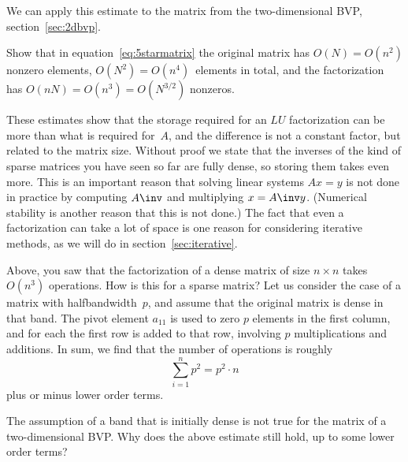 We can apply this estimate to the matrix from the two-dimensional
\ac{BVP}, section~\ref{sec:2dbvp}.  
\begin{exercise}\label{ex:bandfill}
  Show that in equation~\eqref{eq:5starmatrix} the original matrix has
  $O(N)=O(n^2)$ nonzero elements, $O(N^2)=O(n^4)$~elements in total,
  and the factorization has $O(nN)=O(n^3)=O(N^{3/2})$ nonzeros.
\end{exercise}

These estimates show that the storage required for an $LU$
factorization can be more than what is required for~$A$, and the
difference is not a constant factor, but related to the matrix
size. Without proof we state that the inverses of the kind of sparse
matrices you have seen so far are fully dense, so storing them takes
even more. This is an important reason that solving linear systems
$Ax=y$ is not done in practice by computing $A\inv$ and multiplying
$x=A\inv y$. (Numerical stability is another reason that this is not
done.) The fact that even a factorization can take a lot of
space is one reason for considering iterative methods, as we will do
in section~\ref{sec:iterative}.

Above, you saw that the factorization of a dense matrix of size
$n\times n$ takes $O(n^3)$ operations. How is this for a sparse
matrix? Let us consider the case of a matrix with halfbandwidth~$p$,
and assume that the original matrix is dense in that band.
The pivot element $a_{11}$ is used to zero $p$ elements in the first
column, and for each the first row is added to that row, involving $p$
multiplications and additions. In sum, we find that the number of
operations is roughly
\[ \sum_{i=1}^n p^2 = p^2\cdot n \]
plus or minus lower order terms.

\begin{exercise}
  The assumption of a band that is initially dense is not true for the
  matrix of a two-dimensional \ac{BVP}. Why does the above estimate
  still hold, up to some lower order terms?
\end{exercise}

